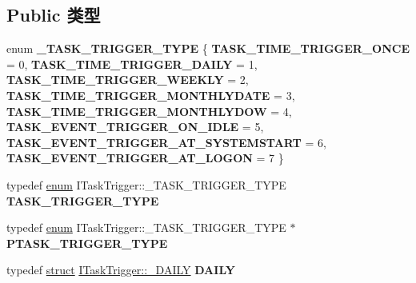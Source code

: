 \subsection*{Public 类型}
\begin{DoxyCompactItemize}
\item 
\mbox{\label{interface_i_task_trigger_a13d7bd575c58c704b588eca9e0e0e5e0}} 
enum {\bfseries \+\_\+\+T\+A\+S\+K\+\_\+\+T\+R\+I\+G\+G\+E\+R\+\_\+\+T\+Y\+PE} \{ \newline
{\bfseries T\+A\+S\+K\+\_\+\+T\+I\+M\+E\+\_\+\+T\+R\+I\+G\+G\+E\+R\+\_\+\+O\+N\+CE} = 0, 
{\bfseries T\+A\+S\+K\+\_\+\+T\+I\+M\+E\+\_\+\+T\+R\+I\+G\+G\+E\+R\+\_\+\+D\+A\+I\+LY} = 1, 
{\bfseries T\+A\+S\+K\+\_\+\+T\+I\+M\+E\+\_\+\+T\+R\+I\+G\+G\+E\+R\+\_\+\+W\+E\+E\+K\+LY} = 2, 
{\bfseries T\+A\+S\+K\+\_\+\+T\+I\+M\+E\+\_\+\+T\+R\+I\+G\+G\+E\+R\+\_\+\+M\+O\+N\+T\+H\+L\+Y\+D\+A\+TE} = 3, 
\newline
{\bfseries T\+A\+S\+K\+\_\+\+T\+I\+M\+E\+\_\+\+T\+R\+I\+G\+G\+E\+R\+\_\+\+M\+O\+N\+T\+H\+L\+Y\+D\+OW} = 4, 
{\bfseries T\+A\+S\+K\+\_\+\+E\+V\+E\+N\+T\+\_\+\+T\+R\+I\+G\+G\+E\+R\+\_\+\+O\+N\+\_\+\+I\+D\+LE} = 5, 
{\bfseries T\+A\+S\+K\+\_\+\+E\+V\+E\+N\+T\+\_\+\+T\+R\+I\+G\+G\+E\+R\+\_\+\+A\+T\+\_\+\+S\+Y\+S\+T\+E\+M\+S\+T\+A\+RT} = 6, 
{\bfseries T\+A\+S\+K\+\_\+\+E\+V\+E\+N\+T\+\_\+\+T\+R\+I\+G\+G\+E\+R\+\_\+\+A\+T\+\_\+\+L\+O\+G\+ON} = 7
 \}
\item 
\mbox{\label{interface_i_task_trigger_a8bc33b59b84d91ac5fc29748ebd0c889}} 
typedef \hyperlink{interfaceenum}{enum} I\+Task\+Trigger\+::\+\_\+\+T\+A\+S\+K\+\_\+\+T\+R\+I\+G\+G\+E\+R\+\_\+\+T\+Y\+PE {\bfseries T\+A\+S\+K\+\_\+\+T\+R\+I\+G\+G\+E\+R\+\_\+\+T\+Y\+PE}
\item 
\mbox{\label{interface_i_task_trigger_a7b72eebc1e8aafdd40082ae5420411b8}} 
typedef \hyperlink{interfaceenum}{enum} I\+Task\+Trigger\+::\+\_\+\+T\+A\+S\+K\+\_\+\+T\+R\+I\+G\+G\+E\+R\+\_\+\+T\+Y\+PE $\ast$ {\bfseries P\+T\+A\+S\+K\+\_\+\+T\+R\+I\+G\+G\+E\+R\+\_\+\+T\+Y\+PE}
\item 
\mbox{\label{interface_i_task_trigger_a3652d1052334cbd064debe7d954408ba}} 
typedef \hyperlink{interfacestruct}{struct} \hyperlink{struct_i_task_trigger_1_1___d_a_i_l_y}{I\+Task\+Trigger\+::\+\_\+\+D\+A\+I\+LY} {\bfseries D\+A\+I\+LY}
\item 

\end{DoxyCompactItemize}
